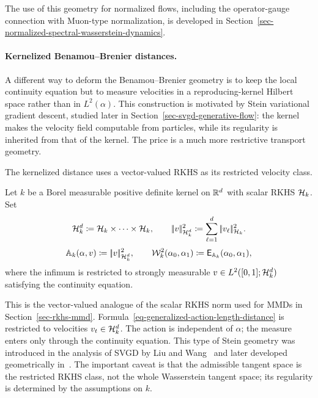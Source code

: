 The use of this geometry for normalized flows, including the operator-gauge connection with Muon-type normalization, is developed in Section~\ref{sec-normalized-spectral-wasserstein-dynamics}.

\paragraph{Kernelized Benamou--Brenier distances.}\label{sec-kernelized-bb-distance}
A different way to deform the Benamou--Brenier geometry is to keep the local continuity equation but to measure velocities in a reproducing-kernel Hilbert space rather than in $L^2(\alpha)$. This construction is motivated by Stein variational gradient descent, studied later in Section~\ref{sec-svgd-generative-flow}: the kernel makes the velocity field computable from particles, while its regularity is inherited from that of the kernel. The price is a much more restrictive transport geometry.

The kernelized distance uses a vector-valued RKHS as its restricted velocity class.
\begin{defn}\label{def-kernelized-bb-distance}
Let $k$ be a Borel measurable positive definite kernel on $\mathbb{R}^d$ with scalar RKHS $\mathcal{H}_k$. Set
\[
	\mathcal{H}_k^d\coloneqq \mathcal{H}_k\times\cdots\times\mathcal{H}_k,
	\qquad
	|\!| v |\!|_{\mathcal{H}_k^d}^2
	\coloneqq
	\sum_{\ell=1}^d|\!| v_\ell |\!|_{\mathcal{H}_k}^2.
\]
\begin{equation}\label{eq-kernelized-bb-distance}
	\mathbb A_k(\alpha,v)
	\coloneqq
	|\!| v |\!|_{\mathcal{H}_k^d}^2,
	\qquad
	\mathcal W_k^2(\alpha_0,\alpha_1)
	\coloneqq
	\mathsf E_{\mathbb A_k}(\alpha_0,\alpha_1),
\end{equation}
where the infimum is restricted to strongly measurable $v\in L^2([0,1];\mathcal{H}_k^d)$ satisfying the continuity equation.
\end{defn}
This is the vector-valued analogue of the scalar RKHS norm used for MMDs in Section~\ref{sec-rkhs-mmd}. Formula~\eqref{eq-generalized-action-length-distance} is restricted to velocities \(v_t\in\mathcal{H}_k^d\). The action is independent of \(\alpha\); the measure enters only through the continuity equation. This type of Stein geometry was introduced in the analysis of SVGD by Liu and Wang~\cite{LiuWang2016SVGD,Liu2017SVGDGradientFlow} and later developed geometrically in~\cite{DuncanNueskenSzpruch2019SVGDGeometry,NueskenRenger2021SVGDAsymptotics}. The important caveat is that the admissible tangent space is the restricted RKHS class, not the whole Wasserstein tangent space; its regularity is determined by the assumptions on $k$.

